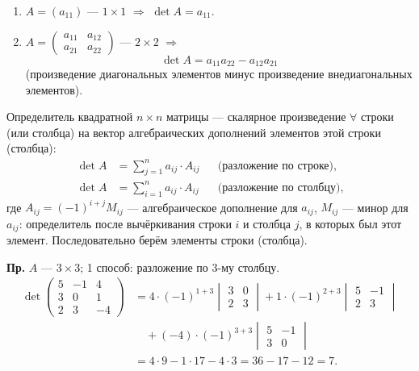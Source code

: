 \documentclass[a4paper, 12pt]{article}
\begin{document}
\begin{enumerate}[label=\arabic*)]
  \item $A = (a_{11})$ --- $1 \times 1$ $\Rightarrow$ $\det A = a_{11}$.
  \item $A = \begin{pmatrix} a_{11} & a_{12} \\ a_{21} & a_{22} \end{pmatrix}$ --- $2 \times 2$
    $\Rightarrow$
    \[
      \det A = a_{11} a_{22} - a_{12} a_{21}
    \]
    (произведение диагональных элементов минус произведение внедиагональных
    элементов).
\end{enumerate}

Определитель квадратной $n \times n$ матрицы --- скалярное произведение
$\forall$ строки (или столбца) на вектор алгебраических дополнений элементов
этой строки (столбца):
\begin{align*}
  \det A &= \sum_{j=1}^{n} a_{ij} \cdot A_{ij} && \text{(разложение по строке)},\\
  \det A &= \sum_{i=1}^{n} a_{ij} \cdot A_{ij} && \text{(разложение по столбцу)},
\end{align*}
где $A_{ij} = (-1)^{i+j} M_{ij}$ --- алгебраическое дополнение для $a_{ij}$,
$M_{ij}$ --- минор для $a_{ij}$: определитель после вычёркивания строки $i$
и столбца $j$, в которых был этот элемент. Последовательно берём элементы
строки (столбца).

\textbf{Пр.} $A$ --- $3 \times 3$; 1 способ: разложение по 3-му столбцу.
\begin{align*}
  \det \begin{pmatrix} 5 & -1 & 4 \\ 3 & 0 & 1 \\ 2 & 3 & -4 \end{pmatrix}
  &= 4 \cdot (-1)^{1+3} \begin{vmatrix} 3 & 0 \\ 2 & 3 \end{vmatrix}
   + 1 \cdot (-1)^{2+3} \begin{vmatrix} 5 & -1 \\ 2 & 3 \end{vmatrix} \\
  &\quad + (-4) \cdot (-1)^{3+3} \begin{vmatrix} 5 & -1 \\ 3 & 0 \end{vmatrix} \\
  &= 4 \cdot 9 - 1 \cdot 17 - 4 \cdot 3 = 36 - 17 - 12 = 7.
\end{align*}
\end{document}
